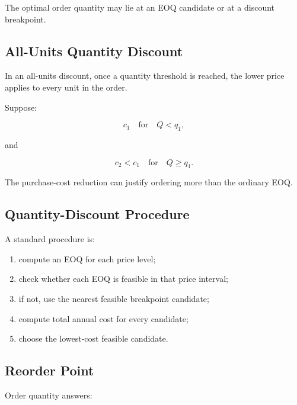 The optimal order quantity may lie at an EOQ candidate or at a discount
breakpoint.

\subsection{All-Units Quantity Discount}
\label{subsec:all-units-discount}

In an all-units discount, once a quantity threshold is reached, the lower
price applies to every unit in the order.

Suppose:

\[
c_1
\quad
\text{for}
\quad
Q<q_1,
\]

and

\[
c_2<c_1
\quad
\text{for}
\quad
Q\geq q_1.
\]

The purchase-cost reduction can justify ordering more than the ordinary
EOQ.

\subsection{Quantity-Discount Procedure}
\label{subsec:quantity-discount-procedure}

A standard procedure is:

\begin{enumerate}
    \item compute an EOQ for each price level;
    \item check whether each EOQ is feasible in that price interval;
    \item if not, use the nearest feasible breakpoint candidate;
    \item compute total annual cost for every candidate;
    \item choose the lowest-cost feasible candidate.
\end{enumerate}

\subsection{Reorder Point}
\label{subsec:reorder-point}

Order quantity answers:

